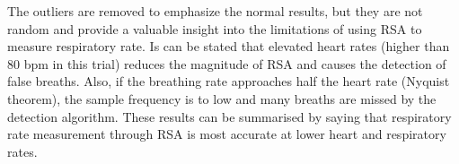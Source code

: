 \medskip

The outliers are removed to emphasize the normal results, but they are not random and provide a valuable insight into the limitations of using RSA to measure respiratory rate. Is can be stated that elevated heart rates (higher than 80 bpm in this trial) reduces the magnitude of RSA  and causes the detection of false breaths. Also, if the breathing rate approaches half the heart rate (Nyquist theorem), the sample frequency is to low and many breaths are missed by the detection algorithm. These results can be summarised by saying that respiratory rate measurement through RSA is most accurate at lower heart and respiratory rates.

